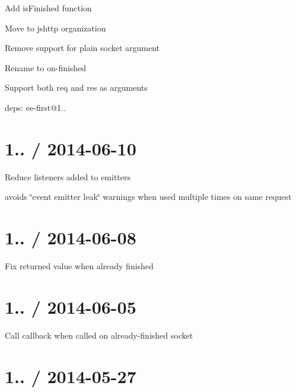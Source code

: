 \begin{DoxyItemize}
\item Add {\ttfamily is\+Finished} function
\item Move to {\ttfamily jshttp} organization
\item Remove support for plain socket argument
\item Rename to {\ttfamily on-\/finished}
\item Support both {\ttfamily req} and {\ttfamily res} as arguments
\item deps\+: ee-\/first@1..
\end{DoxyItemize}

\section*{1.. / 2014-\/06-\/10 }


\begin{DoxyItemize}
\item Reduce listeners added to emitters
\begin{DoxyItemize}
\item avoids \char`\"{}event emitter leak\char`\"{} warnings when used multiple times on same request
\end{DoxyItemize}
\end{DoxyItemize}

\section*{1.. / 2014-\/06-\/08 }


\begin{DoxyItemize}
\item Fix returned value when already finished
\end{DoxyItemize}

\section*{1.. / 2014-\/06-\/05 }


\begin{DoxyItemize}
\item Call callback when called on already-\/finished socket
\end{DoxyItemize}

\section*{1.. / 2014-\/05-\/27 }


